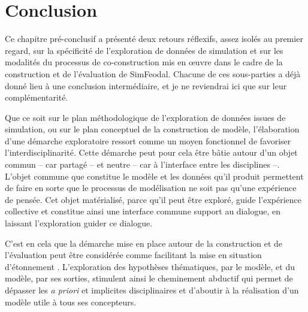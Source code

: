 %
%

\section*{Conclusion}

Ce chapitre \og pré-conclusif\fg{} a présenté deux retours réflexifs, assez isolés au premier regard, sur la spécificité de l'exploration de données de simulation et sur les modalités du processus de co-construction mis en œuvre dans le cadre de la construction et de l'évaluation de SimFeodal.
Chacune de ces sous-parties a déjà donné lieu à une conclusion intermédiaire, et je ne reviendrai ici que sur leur complémentarité.

Que ce soit sur le plan méthodologique de l'exploration de données issues de simulation, ou sur le plan conceptuel de la construction de modèle, l'élaboration d'une démarche exploratoire ressort comme un moyen fonctionnel de favoriser l'interdisciplinarité.
Cette démarche peut pour cela être bâtie autour d'un objet commun -- car partagé -- et neutre -- car à l'interface entre les disciplines --. 
L'objet commune que constitue le modèle et les données qu'il produit permettent de faire en sorte que le processus de modélisation ne soit pas qu'une expérience de pensée.
Cet objet matérialisé, parce qu'il peut être exploré, guide l'expérience collective et constitue ainsi une interface commune support au dialogue, en laissant l'exploration guider ce dialogue.

C'est en cela que la démarche mise en place autour de la construction et de l'évaluation peut être considérée comme facilitant la \og mise en situation d'étonnement\fg{} \autocite[241]{banos2005voie}.
L'exploration des hypothèses thématiques, par le modèle, et du modèle, par ses sorties, stimulent ainsi le cheminement abductif qui permet de dépasser les \textit{a priori} et implicites disciplinaires et d'aboutir à la réalisation d'un modèle utile à tous ses concepteurs.
